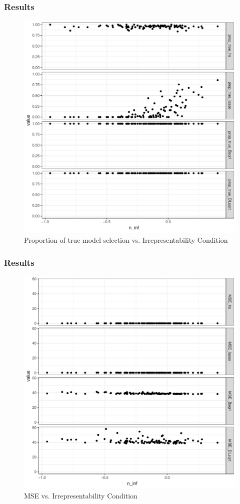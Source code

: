 \documentclass[10pt]{beamer}
\theoremstyle{plain}
\begin{document}
\begin{frame}
	\frametitle{Results}
	\begin{figure}
\includegraphics[width=0.75\columnwidth , height =.8\textheight]{Irrep_model_selec_n100p60_q50_2groups}%
\caption{Proportion of true model selection vs. Irrepresentability Condition}%
\label{fig:profile:MSP_irrep}%
\end{figure}
\end{frame}
\begin{frame}
	\frametitle{Results}
	\begin{figure}
\includegraphics[width=0.75\columnwidth , height =.8\textheight]{Irrep_MSE_selec_n100p60_q50_2groups}%
\caption{MSE vs. Irrepresentability Condition }%
\label{fig:profile:MSP_irrep}%
\end{figure}
\end{frame}
\end{document}
